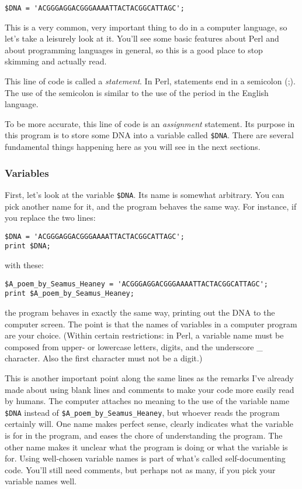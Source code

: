 \begin{lstlisting}
$DNA = 'ACGGGAGGACGGGAAAATTACTACGGCATTAGC';
\end{lstlisting}

This is a very common, very important thing to do in a computer language, so let's take a leisurely look at it. You'll see some basic features about Perl and about programming languages in general, so this is a good place to stop skimming and actually read.

This line of code is called a \textit{statement}. In Perl, statements end in a semicolon (;). The use of the semicolon is similar to the use of the period in the English language.

To be more accurate, this line of code is an \textit{assignment} statement. Its purpose in this program is to store some DNA into a variable called \verb|$DNA|. There are several fundamental things happening here as you will see in the next sections. 

\subsubsection{Variables}
First, let's look at the variable \verb|$DNA|. Its name is somewhat arbitrary. You can pick another name for it, and the program behaves the same way. For instance, if you replace the two lines:

\begin{lstlisting}
$DNA = 'ACGGGAGGACGGGAAAATTACTACGGCATTAGC';
print $DNA;
\end{lstlisting}

with these:

\begin{lstlisting}
$A_poem_by_Seamus_Heaney = 'ACGGGAGGACGGGAAAATTACTACGGCATTAGC';
print $A_poem_by_Seamus_Heaney;
\end{lstlisting}

the program behaves in exactly the same way, printing out the DNA to the computer screen. The point is that the names of variables in a computer program are your choice. (Within certain restrictions: in Perl, a variable name must be composed from upper- or lowercase letters, digits, and the underscore \_ character. Also the first character must not be a digit.)

This is another important point along the same lines as the remarks I've already made about using blank lines and comments to make your code more easily read by humans. The computer attaches no meaning to the use of the variable name \verb|$DNA| instead of \verb|$A_poem_by_Seamus_Heaney|, but whoever reads the program certainly will. One name makes perfect sense, clearly indicates what the variable is for in the program, and eases the chore of understanding the program. The other name makes it unclear what the program is doing or what the variable is for. Using well-chosen variable names is part of what's called self-documenting code. You'll still need comments, but perhaps not as many, if you pick your variable names well.

